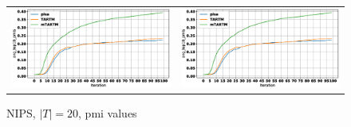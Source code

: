 \documentclass[12pt]{article}
\begin{document}
\begin{figure}[htb]
\centering
  \begin{tabular}{@{}cc@{}}
    \includegraphics[width=.5\linewidth]{pictures/NIPS_20t_avg_top10_pmis.eps} &
    \includegraphics[width=.5\linewidth]{pictures/NIPS_20t_avg_top10_pmis.eps} 
  \end{tabular}
  \caption{NIPS, $|T| = 20$, pmi values}
\end{figure}
\end{document}
